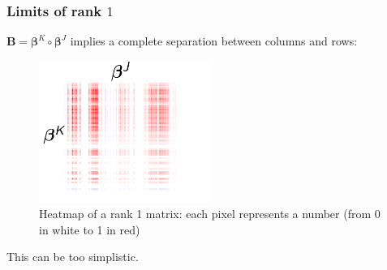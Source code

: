 \documentclass{beamer}
\begin{document}
\begin{frame}
    \frametitle{Limits of rank $1$}
    \vspace{10 pt}
    $\mathbf{B} = \bm{\beta}^K \circ \bm{\beta}^J$ \hspace{0.5 pt} implies a complete separation between columns and rows:
    \begin{figure}
            \centering
            \includegraphics[width=0.5\textwidth]{images/picto_500/heatmap_logistic_multibloc_simu_500_multiway.png}
            \caption{\centering Heatmap of a rank 1 matrix: each pixel represents a number (from 0 in white to 1 in red)}
    \end{figure}
    \begin{center}
        This can be too simplistic.
    \end{center}


\end{frame}
\end{document}
